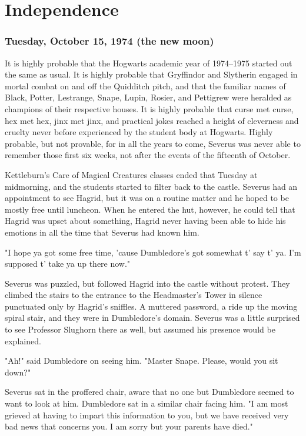 
\chapter{Independence}

\subsection{Tuesday, October 15, 1974 (the new moon)}

It is highly probable that the Hogwarts academic year of 1974--1975 started out the same as usual. It is highly probable that Gryffindor and Slytherin engaged in mortal combat on and off the Quidditch pitch, and that the familiar names of Black, Potter, Lestrange, Snape, Lupin, Rosier, and Pettigrew were heralded as champions of their respective houses. It is highly probable that curse met curse, hex met hex, jinx met jinx, and practical jokes reached a height of cleverness and cruelty never before experienced by the student body at Hogwarts. Highly probable, but not provable, for in all the years to come, Severus was never able to remember those first six weeks, not after the events of the fifteenth of October.

Kettleburn's Care of Magical Creatures classes ended that Tuesday at midmorning, and the students started to filter back to the castle. Severus had an appointment to see Hagrid, but it was on a routine matter and he hoped to be mostly free until luncheon. When he entered the hut, however, he could tell that Hagrid was upset about something, Hagrid never having been able to hide his emotions in all the time that Severus had known him.

"I hope ya got some free time, 'cause Dumbledore's got somewhat t' say t' ya. I'm supposed t' take ya up there now."

Severus was puzzled, but followed Hagrid into the castle without protest. They climbed the stairs to the entrance to the Headmaster's Tower in silence punctuated only by Hagrid's sniffles. A muttered password, a ride up the moving spiral stair, and they were in Dumbledore's domain. Severus was a little surprised to see Professor Slughorn there as well, but assumed his presence would be explained.

"Ah!" said Dumbledore on seeing him. "Master Snape. Please, would you sit down?"

Severus sat in the proffered chair, aware that no one but Dumbledore seemed to want to look at him. Dumbledore sat in a similar chair facing him. "I am most grieved at having to impart this information to you, but we have received very bad news that concerns you. I am sorry but{\el} your parents have died."

